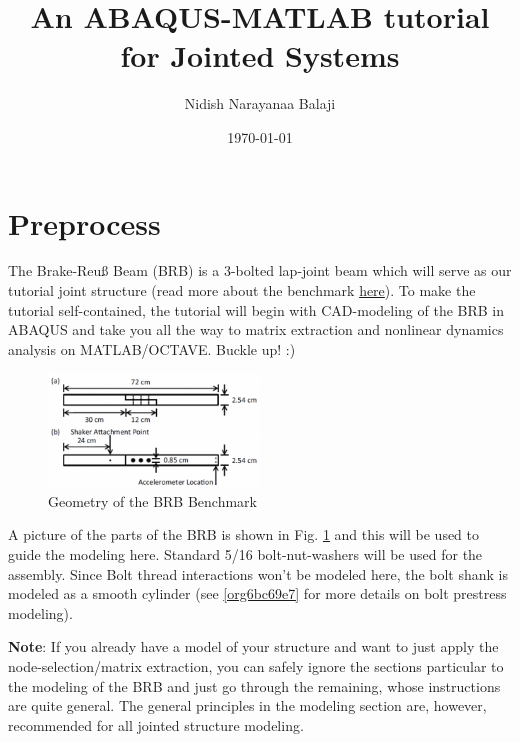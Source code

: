 \documentclass[11pt]{article}
\author{Nidish Narayanaa Balaji}
\date{\today}
\title{An ABAQUS-MATLAB tutorial for Jointed Systems}
\begin{document}
\maketitle
\tableofcontents

\pagebreak

\section{Preprocess}
\label{sec:orgc163437}

The Brake-Reuß Beam (BRB) is a 3-bolted lap-joint beam which will serve as our tutorial joint structure (read more about the benchmark \href{https://jointmechanics.org/index.php/Benchmarks\#The\_Brake-Reu\%C3\%9F\_Beams}{here}).
To make the tutorial self-contained, the tutorial will begin with CAD-modeling of the BRB in ABAQUS and take you all the way to matrix extraction and nonlinear dynamics analysis on MATLAB/OCTAVE.
Buckle up! :)

\begin{figure}[htbp]
\centering
\includegraphics[width=0.5\textwidth]{./figs/300px-BRB.png}
\caption{\label{fig:org7d05cdc}Geometry of the BRB Benchmark}
\end{figure}

A picture of the parts of the BRB is shown in Fig. \ref{fig:org7d05cdc} and this will be used to guide the modeling here.
Standard 5/16 bolt-nut-washers will be used for the assembly. Since Bolt thread interactions won't be modeled here, the bolt shank is modeled as a smooth cylinder (see \ref{org6bc69e7} for more details on bolt prestress modeling).

\textbf{Note}: If you already have a model of your structure and want to just apply the node-selection/matrix extraction, you can safely ignore the sections particular to the modeling of the BRB and just go through the remaining, whose instructions are quite general.
The general principles in the modeling section are, however, recommended for all jointed structure modeling.
\end{document}
